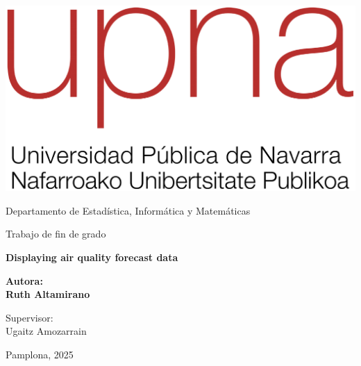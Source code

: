 \begin{titlepage}

  \begin{center}


    \includegraphics[scale=.3]{style/fig/ROJO_UPNA_300ppp.png}

    \vspace{0.5cm}
    \normalsize{Departamento de Estadística, Informática y Matemáticas}

    \vspace{2.5cm}

    {\large Trabajo de fin de grado}\\
    \vspace{1cm}

    \textbf{\Large Displaying air quality forecast data}

    \vspace{3cm}

    \large{\textbf{Autora: }}\\
    \large{\textbf{Ruth Altamirano}}\\

    \vspace{1cm}

    \large{Supervisor:}\\
    \large{Ugaitz Amozarrain}\\

    \vspace{3cm}

    \large{Pamplona, 2025}

  \end{center}

\end{titlepage}

\clearpage
\thispagestyle{empty}
\hfill
\clearpage
